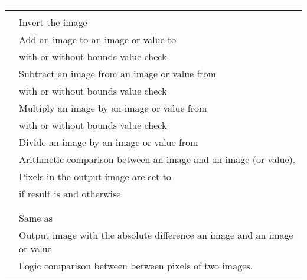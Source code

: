 
%
%  
%
\begin{table}[h!]
  \centering
  \begin{tabularx}{\linewidth}{|l|Y|}
    \toprule
      \\
    \toprule
                                &   \\
    \hline \hline
                       & Invert the image  \\
    \hline
          & Add an image to an image or value to   \\
     & with or without bounds value check  \\
    \hline
          & Subtract an image from an image or value from   \\
     & with or without bounds value check  \\
    \hline
          & Multiply an image by an image or value from   \\
     & with or without bounds value check  \\
    \hline
          & Divide an image by an image or value from   \\
    \hline
          & Arithmetic comparison between an image and an image (or value).  \\
     & Pixels in the output image are set to  \\
          &  if result is  and  otherwise  \\
     &  \\
          &  \\
    \hline
         & Same as   \\
    \hline
      & Output image with the absolute difference an image and an image or value  \\
    \hline
               & Logic comparison between between pixels of two images.  \\

\end{tabularx}
\end{table}
